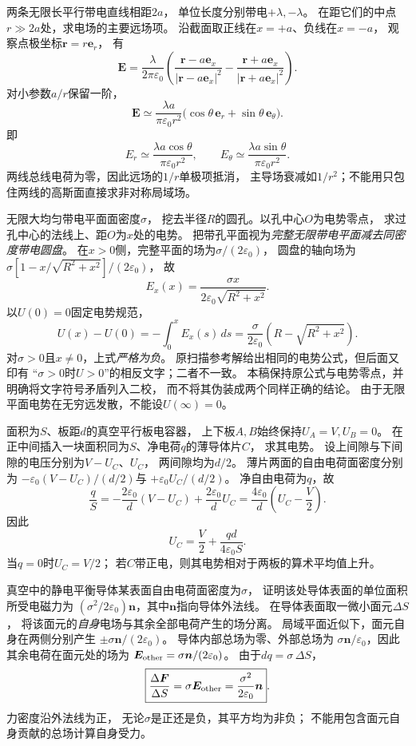 \problemtext 两条无限长平行带电直线相距$2a$，
单位长度分别带电$+\lambda,-\lambda$。
在距它们的中点$r\gg2a$处，求电场的主要远场项。
\workings
沿截面取正线在$x=+a$、负线在$x=-a$，
观察点极坐标$\bm r=r\bm e_r$，
有
\[
\bm E=\frac{\lambda}{2\pi\varepsilon_0}
\left(\frac{\bm r-a\bm e_x}{|\bm r-a\bm e_x|^2}
-\frac{\bm r+a\bm e_x}{|\bm r+a\bm e_x|^2}\right).
\]
对小参数$a/r$保留一阶，
\[
\boxed{\bm E\simeq\frac{\lambda a}{\pi\varepsilon_0r^2}
\bigl(\cos\theta\,\bm e_r+\sin\theta\,\bm e_\theta\bigr)}.
\]
即
\[
\boxed{E_r\simeq\frac{\lambda a\cos\theta}{\pi\varepsilon_0r^2},
\qquad E_\theta\simeq\frac{\lambda a\sin\theta}{\pi\varepsilon_0r^2}}.
\]
\crosscheck 两线总线电荷为零，因此远场的$1/r$单极项抵消，
主导场衰减如$1/r^2$；不能用只包住两线的高斯面直接求非对称局域场。

\problemtext 无限大均匀带电平面面密度$\sigma$，
挖去半径$R$的圆孔。以孔中心$O$为电势零点，
求过孔中心的法线上、距$O$为$x$处的电势。
\workings
把带孔平面视为\emph{完整无限带电平面减去同密度带电圆盘}。
在$x>0$侧，完整平面的场为$\sigma/(2\varepsilon_0)$，
圆盘的轴向场为
$\sigma[1-x/\sqrt{R^2+x^2}]/(2\varepsilon_0)$，
故
\[
\boxed{E_x(x)=\frac{\sigma x}{2\varepsilon_0\sqrt{R^2+x^2}}}.
\]
以$U(0)=0$固定电势规范，
\[
\boxed{U(x)-U(0)
=-\int_0^x E_x(s)\,ds
=\frac{\sigma}{2\varepsilon_0}
\left(R-\sqrt{R^2+x^2}\right)}.
\]
\crosscheck 对$\sigma>0$且$x\ne0$，上式\emph{严格为负}。
原扫描参考解给出相同的电势公式，但后面又印有
“$\sigma>0$时$U>0$”的相反文字；二者不一致。
本稿保持原公式与电势零点，并明确将文字符号矛盾列入二校，
而不将其伪装成两个同样正确的结论。
由于无限平面电势在无穷远发散，不能设$U(\infty)=0$。

\problemtext 面积为$S$、板距$d$的真空平行板电容器，
上下板$A,B$始终保持$U_A=V,U_B=0$。
在正中间插入一块面积同为$S$、净电荷$q$的薄导体片$C$，
求其电势。
\workings
设上间隙与下间隙的电压分别为$V-U_C$、$U_C$，
两间隙均为$d/2$。
薄片两面的自由电荷面密度分别为
$-\varepsilon_0(V-U_C)/(d/2)$与
$+\varepsilon_0U_C/(d/2)$。
净自由电荷为$q$，故
\[
\frac qS=-\frac{2\varepsilon_0}{d}(V-U_C)
+\frac{2\varepsilon_0}{d}U_C
=\frac{4\varepsilon_0}{d}\left(U_C-\frac V2\right).
\]
因此
\[
\boxed{U_C=\frac V2+\frac{qd}{4\varepsilon_0S}}.
\]
\crosscheck 当$q=0$时$U_C=V/2$；
若$C$带正电，则其电势相对于两板的算术平均值上升。

\problemtext 真空中的静电平衡导体某表面自由电荷面密度为$\sigma$，
证明该处导体表面的单位面积所受电磁力为
$(\sigma^2/2\varepsilon_0)\bm n$，其中$\bm n$指向导体外法线。
\workings
在导体表面取一微小面元$\Delta S$，
将该面元的\emph{自身}电场与其余全部电荷产生的场分离。
局域平面近似下，面元自身在两侧分别产生
$\pm \sigma\bm n/(2\varepsilon_0)$。
导体内部总场为零、外部总场为
$\sigma\bm n/\varepsilon_0$，因此其余电荷在面元处的场为
$\bm E_{\rm other}=\sigma\bm n/(2\varepsilon_0)$。
由于$dq=\sigma\,\Delta S$，
\[
\boxed{\frac{\Delta\bm F}{\Delta S}
=\sigma\bm E_{\rm other}
=\frac{\sigma^2}{2\varepsilon_0}\bm n}.
\]
\crosscheck 力密度沿外法线为正，
无论$\sigma$是正还是负，其平方均为非负；
不能用包含面元自身贡献的总场计算自身受力。

